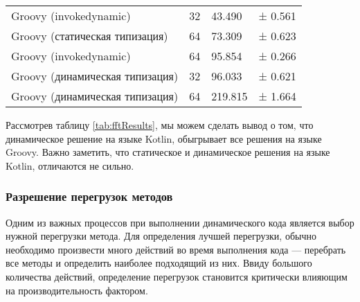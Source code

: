 \begin{table}[h]
\begin{center}
\begin{tabular}{|l|l|l|l|}
Groovy (invokedynamic)                   & 32 &  43.490 & ± 0.561 \\
Groovy (статическая типизация)           & 64 &  73.309 & ± 0.623 \\
Groovy (invokedynamic)                   & 64 &  95.854 & ± 0.266 \\
Groovy (динамическая типизация)          & 32 &  96.033 & ± 0.621 \\
Groovy (динамическая типизация)          & 64 & 219.815 & ± 1.664 \\
\hline
\end{tabular}
\end{center}
\end{table} 

Рассмотрев таблицу \ref{tab:fftResults}, мы можем сделать вывод о том, что динамическое решение на языке Kotlin, обыгрывает все решения на языке Groovy. Важно заметить, что статическое и динамическое решения на языке Kotlin, отличаются не сильно.


\subsubsection{Разрешение перегрузок методов}

Одним из важных процессов при выполнении динамического кода является выбор нужной перегрузки метода. Для определения лучшей перегрузки, обычно необходимо произвести много действий во время выполнения кода --- перебрать все методы и определить наиболее подходящий из них. Ввиду большого количества действий, определение перегрузок становится критически влияющим на производительность фактором.

